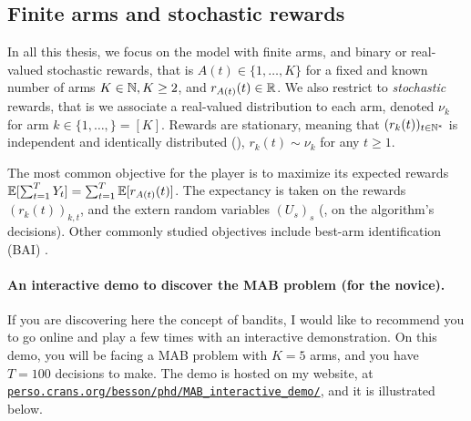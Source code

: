 \subsection{Finite arms and stochastic rewards}


In all this thesis, we focus on the model with finite arms, and binary or real-valued stochastic rewards, that is $A(t)\in\{1,\dots,K\}$ for a fixed and known number of arms $K\in\mathbb{N},K\geq2$, and $r_{A(t)}(t)\in\mathbb{R}$.
%
%
We also restrict to \emph{stochastic} rewards, that is we associate a real-valued distribution to each arm, denoted $\nu_k$ for arm $k\in\{1,\dots,\}=[K]$.
Rewards are stationary, meaning that $(r_k(t))_{t\in\mathbb{N}^*}$ is independent and identically distributed (\iid), $r_k(t) \sim \nu_k$ for any $t\geq1$.

The most common objective for the player is to maximize its expected rewards $\mathbb{E}[\sum_{t=1}^T Y_t] = \sum_{t=1}^T \mathbb{E}[r_{A(t)}(t)]$.
The expectancy is taken on the rewards $(r_k(t))_{k,t}$, and the extern random variables $(U_s)_s$ (\ie, on the algorithm's decisions).
%
Other commonly studied objectives include best-arm identification (BAI) \cite{audibert2010best}.


\paragraph{An interactive demo to discover the MAB problem (for the novice).}
\label{par:2:interactiveDemoDiscoverMAB}
%
If you are discovering here the concept of bandits, I would like to recommend you to go online and play a few times with an interactive demonstration.
On this demo, you will be facing a MAB problem with $K=5$ arms, and you have $T=100$ decisions to make.
The demo is hosted on my website, at \href{https://perso.crans.org/besson/phd/MAB\_interactive\_demo/}{\texttt{perso.crans.org/besson/phd/MAB\_interactive\_demo/}}, and it is illustrated below.


